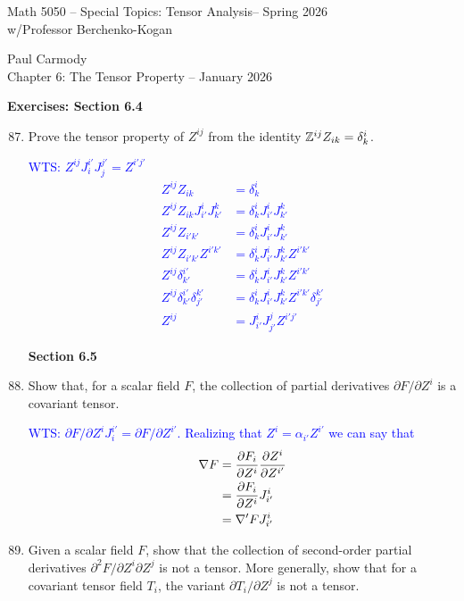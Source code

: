 \documentclass[12pt,a4paper]{report}
\newcommand{\CLASSNAME}{Math 5050 -- Special Topics: Tensor Analysis}
\newcommand{\STUDENTNAME}{Paul Carmody}
\newcommand{\ASSIGNMENT}{Chapter 6: The Tensor Property }
\newcommand{\DUEDATE}{January 2026}
\newcommand{\PROFESSOR}{Professor Berchenko-Kogan}
\newcommand{\SEMESTER}{Spring 2026}
\newcommand{\BLUE}[1]{\textcolor{blue}{#1}}
\begin{document}
\begin{center}
	\Large{\CLASSNAME -- \SEMESTER} \\
	\large{ w/\PROFESSOR}
\end{center}
\begin{center}
	\STUDENTNAME \\
	\ASSIGNMENT -- \DUEDATE\\
\end{center} 

\textbf{Exercises: Section 6.4}
\begin{enumerate}[label=\textbf{\arabic*.}]
\setcounter{enumi}{86}
\item Prove the tensor property of $Z^{ij}$ from the identity $\mathbb{Z}^{ij}Z_{ik}=\delta^i_k$.

\BLUE{WTS: $Z^{ij}J^{i'}_iJ^{j'}_j=Z^{i'j'}$
\begin{align*}
	Z^{ij}Z_{ik}&=\delta^i_k\\
	Z^{ij}Z_{ik}J^i_{i'}J^k_{k'} &= \delta^i_kJ^i_{i'}J^k_{k'}\\
	Z^{ij}Z_{i'k'} &= \delta^i_kJ^i_{i'}J^k_{k'}\\
	Z^{ij}Z_{i'k'}Z^{i'k'} &= \delta^i_kJ^i_{i'}J^k_{k'}Z^{i'k'} \\
	Z^{ij}\delta^{i'}_{k'} &= \delta^i_kJ^i_{i'}J^k_{k'}Z^{i'k'} \\
	Z^{ij}\delta^{i'}_{k'} \delta^{k'}_{j'}&= \delta^i_kJ^i_{i'}J^k_{k'}Z^{i'k'}\delta^{k'}_{j'}  \\
	Z^{ij}&= J^i_{i'}J^j_{j'}Z^{i'j'}
\end{align*}
}

\textbf{Section 6.5}
\item Show that, for a scalar field $F$, the collection of partial derivatives $\partial F/\partial Z^i$ is a covariant tensor.

\BLUE{WTS: $\partial F/\partial Z^i J_i^{i'} = \partial F/\partial Z^{i'}$.  Realizing that $Z^i = \alpha_{i'}Z^{i'}$  we can say that
\begin{align*}
	\nabla F &= \frac{\partial F_i}{\partial  Z^i} \frac{\partial Z^i}{\partial Z^{i'}} \\
	&= \frac{\partial F_i}{\partial  Z^i} J^i_{i'} \\
	&= \nabla' F J^i_{i'}
\end{align*}
}

\item Given a scalar field $F$, show that the collection of second-order partial derivatives $\partial^2 F/\partial Z^i\partial Z^j$ is not a tensor.  More generally, show that for a covariant tensor field $T_i$, the variant $\partial T_i/\partial Z^j$ is not a tensor.


\end{enumerate}
\end{document}
